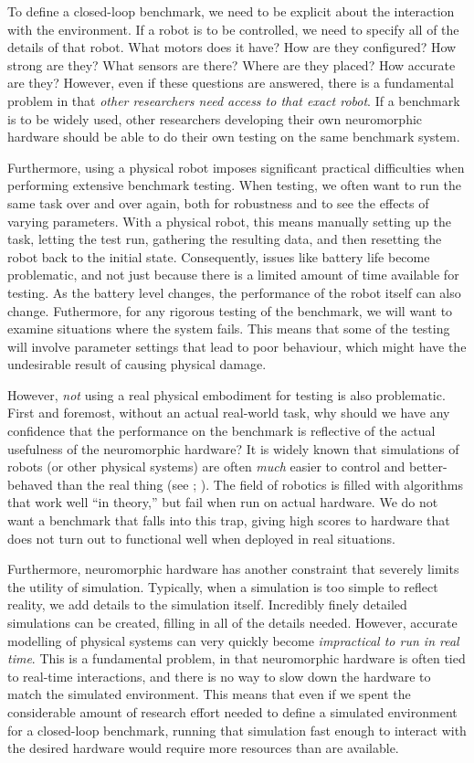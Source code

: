 \documentclass{frontiersSCNS} %
\begin{document}
To define a closed-loop benchmark, we need to be explicit about the interaction with the environment.  If
a robot is to be controlled, we need to specify all of the details of that robot.  What motors does it have?  How are they
configured?  How strong are they?  What sensors are there?  Where are they
placed?  How accurate are they?  However, even if these questions are
answered, there is a fundamental problem in that \emph{other researchers
need access to that exact robot}.  If a benchmark is to be widely used, other
researchers developing their own neuromorphic hardware should be able to do their own 
testing on the same benchmark system.

Furthermore, using a physical robot imposes significant practical
difficulties when performing extensive benchmark testing.  When testing, we
often want to run the same task over and over again, both for robustness and
to see the effects of varying parameters.  With a physical robot, this means
manually setting up the task, letting the test run, gathering the resulting
data, and then resetting the robot back to the initial state.  Consequently,
issues like battery life become problematic, and not just because there is a
limited amount of time available for testing.  As the battery level changes,
the performance of the robot itself can also change.  Futhermore, for any
rigorous testing of the benchmark, we will want to examine situations where
the system fails.  This means that some of the testing will involve parameter
settings that lead to poor behaviour, which might have the undesirable 
result of causing physical damage.

However, \emph{not} using a real physical embodiment for testing is also
problematic.  First and foremost, without an actual real-world task, why
should we have any confidence that the performance on the benchmark is
reflective of the actual usefulness of the neuromorphic hardware?  It is
widely known that simulations of robots (or other physical systems) are
often \emph{much} easier to control and better-behaved than the real thing 
(see \citealt{Jakobi95}; \citealt{Koos2013}).  The
field of robotics is filled with algorithms that work well ``in theory,'' but
fail when run on actual hardware.  We do not want a benchmark that falls into
this trap, giving high scores to hardware that does not turn out to
functional well when deployed in real situations.

Furthermore, neuromorphic hardware has another constraint that severely limits
the utility of simulation.  Typically, when a simulation is
too simple to reflect reality, we add details to the simulation itself.
Incredibly finely detailed simulations can be created, filling in all of the
details needed.  However, accurate modelling of physical systems can very quickly
become \emph{impractical to run in real time}.
This is a fundamental problem, in that neuromorphic
hardware is often tied to real-time interactions, and there is no way to slow down
the hardware to match the simulated environment.  This means that even if
we spent the considerable amount of research effort needed to define a
simulated environment for a closed-loop benchmark, running that simulation 
fast enough to interact with the desired hardware would require more
resources than are available.  
\end{document}

